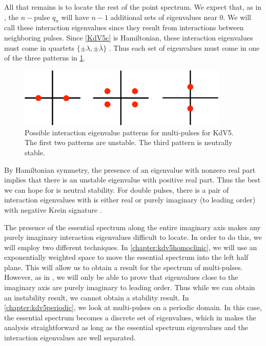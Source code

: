 \documentclass[thesis.tex]{subfiles}
\begin{document}
All that remains is to locate the rest of the point spectrum. We expect that, as in \cite{Sandstede1998}, the $n-$pulse $q_n$ will have $n-1$ additional sets of eigenvalues near 0. We will call these interaction eigenvalues since they result from interactions between neighboring pulses. Since \cref{KdV5c} is Hamiltonian, these interaction eigenvalues must come in quartets $\{ \pm \lambda, \pm \overline{\lambda}\}$ \cite[Proposition 5.1.2]{Kapitula2013}. Thus each set of eigenvalues must come in one of the three patterns in \cref{fig:kdv5inteigpattern}.

\begin{figure}
\begin{center}
\includegraphics[width=10cm]{images/kdv5/eigdouble2}
\end{center}
\caption[Possible interaction eigenvalue patterns for KdV5]{Possible interaction eigenvalue patterns for multi-pulses for KdV5. The first two patterns are unstable. The third pattern is neutrally stable.}
\label{fig:kdv5inteigpattern}
\end{figure}

\noi By Hamiltonian symmetry, the presence of an eigenvalue with nonzero real part implies that there is an unstable eigenvalue with positive real part. Thus the best we can hope for is neutral stability. For double pulses, there is a pair of interaction eigenvalues with is either real or purely imaginary (to leading order) with negative Krein signature \cite[Theorem 2.3]{Pelinovsky2007}. 

The presence of the essential spectrum along the entire imaginary axis makes any purely imaginary interaction eigenvalues difficult to locate. In order to do this, we will employ two different techniques. In \cref{chapter:kdv5homoclinic}, we will use an exponentially weighted space to move the essential spectrum into the left half plane. This will allow us to obtain a result for the spectrum of multi-pulses. However, as in \cite{Pelinovsky2007}, we will only be able to prove that eigenvalues close to the imaginary axis are purely imaginary to leading order. Thus while we can obtain an instability result, we cannot obtain a stability result. In \cref{chapter:kdv5periodic}, we look at multi-pulses on a periodic domain. In this case, the essential spectrum becomes a discrete set of eigenvalues, which in makes the analysis straightforward as long as the essential spectrum eigenvalues and the interaction eigenvalues are well separated.

\iffulldocument\else
	
	
\fi
\end{document}

